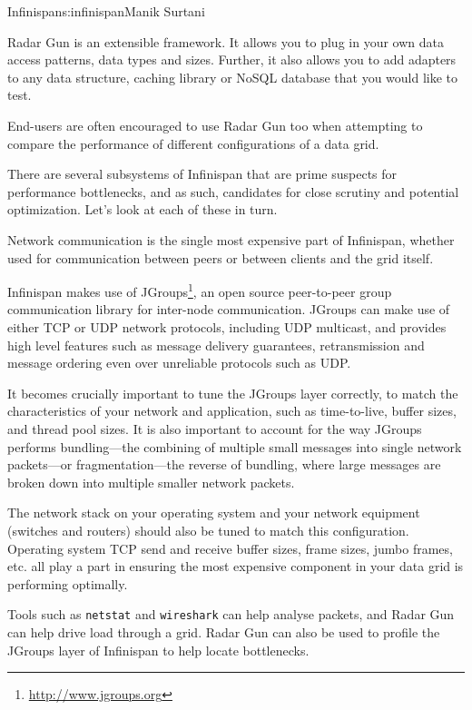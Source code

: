 \begin{aosachapter}{Infinispan}{s:infinispan}{Manik Surtani}

Radar Gun is an extensible framework. It allows you to plug in your own
data access patterns, data types and sizes. Further, it also allows you
to add adapters to any data structure, caching library or NoSQL database
that you would like to test.

End-users are often encouraged to use Radar Gun too when attempting to
compare the performance of different configurations of a data grid.


There are several subsystems of Infinispan that are prime suspects for
performance bottlenecks, and as such, candidates for close scrutiny and
potential optimization. Let's look at each of these in turn.


Network communication is the single most expensive part of Infinispan,
whether used for communication between peers or between clients and the
grid itself.


Infinispan makes use of JGroups\footnote{\url{http://www.jgroups.org}},
an open source peer-to-peer group communication library for inter-node
communication. JGroups can make use of either TCP or UDP network
protocols, including UDP multicast, and provides high level features
such as message delivery guarantees, retransmission and message ordering
even over unreliable protocols such as UDP.

It becomes crucially important to tune the JGroups layer correctly, to
match the characteristics of your network and application, such as
time-to-live, buffer sizes, and thread pool sizes. It is also important
to account for the way JGroups performs bundling---the combining of
multiple small messages into single network packets---or
fragmentation---the reverse of bundling, where large messages are broken
down into multiple smaller network packets.

The network stack on your operating system and your network equipment
(switches and routers) should also be tuned to match this configuration.
Operating system TCP send and receive buffer sizes, frame sizes, jumbo
frames, etc. all play a part in ensuring the most expensive component in
your data grid is performing optimally.

Tools such as \texttt{netstat} and \texttt{wireshark} can help analyse
packets, and Radar Gun can help drive load through a grid. Radar Gun
can also be used to profile the JGroups layer of Infinispan to help
locate bottlenecks.


\end{aosachapter}
